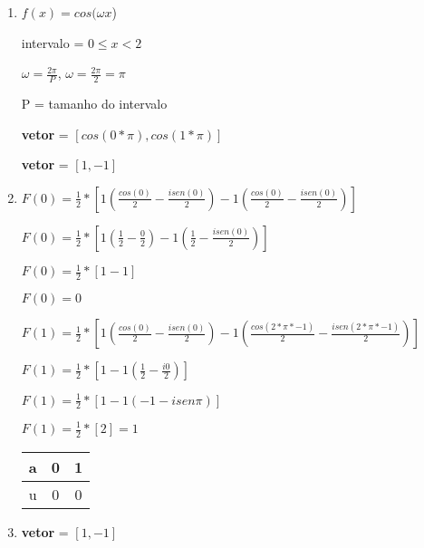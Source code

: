 \begin{question}

	\begin{enumerate}[label=\textbf{\alph*})]

		\item 
		
		$f(x) = cos (\omega x$)

		intervalo = $0 \leq x < 2$ 

		$\omega = \frac{2\pi}{P}$, $\omega = \frac{2\pi}{2} = \pi$
  
		P = tamanho do intervalo

		\textbf{vetor} = $[ cos(0*\pi), cos(1*\pi) ]$

		\textbf{vetor} = $[ 1, -1 ]$

  		\item 
		  
		$F(0) = \frac{1}{2} * [ 1(\frac{cos(0)}{2} - \frac{i sen(0)}{2}) -1(\frac{cos(0)}{2} - \frac{i sen(0)}{2}) ]$

		$F(0) = \frac{1}{2} * [ 1(\frac{1}{2} - \frac{0}{2}) -1(\frac{1}{2} - \frac{i sen(0)}{2}) ]$

		$F(0) = \frac{1}{2} * [ 1-1 ]$

		$F(0) = 0$ 

		\vspace*{0.5cm}

		$F(1) = \frac{1}{2} * [ 1(\frac{cos(0)}{2} - \frac{i sen(0)}{2}) -1(\frac{cos(2*\pi*-1)}{2} - \frac{i sen(2*\pi*-1)}{2}) ]$

		$F(1) = \frac{1}{2} * [ 1 -1(\frac{1}{2} - \frac{i 0}{2}) ]$

		$F(1) = \frac{1}{2} * [ 1 -1(-1 - i sen\pi) ]$

		$F(1) = \frac{1}{2} * [ 2 ] = 1$ 
		
		\begin{minipage}{\linewidth}
			\centering 
			\begin{tabular}{|c|c|c|}
				\hline
				a & 0 & 1 \\
				\hline
				u & 0 & 0 \\
				\hline
			\end{tabular}

		\end{minipage}

    	\item
        
		\textbf{vetor} = $[ 1, -1 ]$


\end{enumerate}
\end{question}
